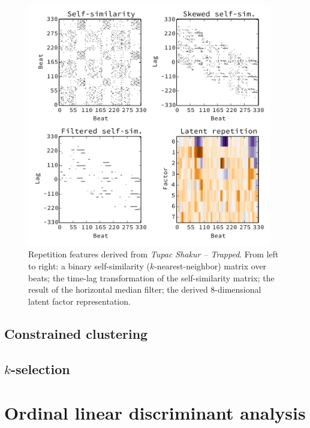 \documentclass{article}
\begin{document}
\begin{figure}[t]
\centering%
\includegraphics[width=0.95\textwidth]{figs/rep}
\caption{Repetition features derived from \emph{Tupac Shakur -- Trapped}. 
From left to right: a binary self-similarity ($k$-nearest-neighbor) 
matrix over beats; 
the time-lag transformation of the self-similarity matrix; 
the result of the horizontal median filter;
the derived 8-dimensional latent factor representation.\label{fig:rep}}
\end{figure}


\subsection{Constrained clustering}
\cite{ward1963hierarchical}
\cite{pedregosa2011scikit}

\subsection{$k$-selection}

\cite{akaike1973information}

\section{Ordinal linear discriminant analysis}
\label{sec:olda}

\cite{fisher1936use, fukunaga1990introduction}
\end{document}
